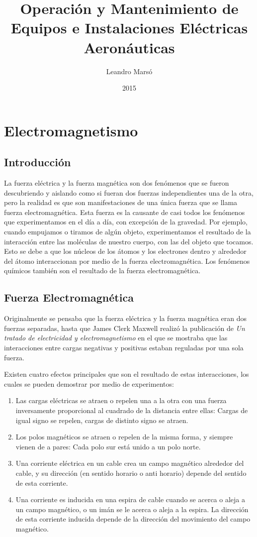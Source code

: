 \documentclass{article}
\title{Operación y Mantenimiento de Equipos e Instalaciones Eléctricas Aeronáuticas}
\author{Leandro Marsó}
\date{2015}
\begin{document}
\maketitle
\pagebreak
\tableofcontents
\pagebreak

\section{Electromagnetismo}
\subsection{Introducción}

La fuerza eléctrica y la fuerza magnética son dos fenómenos que se fueron descubriendo y aislando como si fueran dos fuerzas independientes una de la otra, pero la realidad es que son manifestaciones de una única fuerza que se llama fuerza electromagnética. Esta fuerza es la causante de casi todos los fenómenos que experimentamos en el día a día, con excepción de la gravedad. Por ejemplo, cuando empujamos o tiramos de algún objeto, experimentamos el resultado de la interacción entre las moléculas de nuestro cuerpo, con las del objeto que tocamos. Esto se debe a que los núcleos de los átomos y los electrones dentro y alrededor del átomo interaccionan por medio de la fuerza electromagnética. Los fenómenos químicos también son el resultado de la fuerza electromagnética.

\subsection{Fuerza Electromagnética}
Originalmente se pensaba que la fuerza eléctrica y la fuerza magnética eran dos fuerzas separadas, hasta que James Clerk Maxwell realizó la publicación de \emph{Un tratado de electricidad y electromagnetismo} en el que se mostraba que las interacciones entre cargas negativas y positivas estaban reguladas por una sola fuerza.

Existen cuatro efectos principales que son el resultado de estas interacciones, los cuales se pueden demostrar por medio de experimentos:

\begin{enumerate}
\item Las cargas eléctricas se atraen o repelen una a la otra con una fuerza inversamente proporcional al cuadrado de la distancia entre ellas: Cargas de igual signo se repelen, cargas de distinto signo se atraen.
\item Los polos magnéticos se atraen o repelen de la misma forma, y siempre vienen de a pares: Cada polo sur está unido a un polo norte.
\item Una corriente eléctrica en un cable crea un campo magnético alrededor del cable, y su dirección (en sentido horario o anti horario) depende del sentido de esta corriente.
\item Una corriente es inducida en una espira de cable cuando se acerca o aleja a un campo magnético, o un imán se le acerca o aleja a la espira. La dirección de esta corriente inducida depende de la dirección del movimiento del campo magnético.
\end{enumerate}
\end{document}
